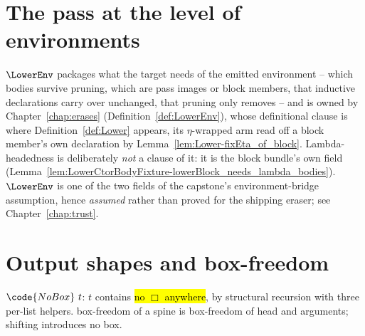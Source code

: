 \section{The pass at the level of environments}
\label{sec:lowering:env}

$\LowerEnv$ packages what the target needs of the emitted environment -- which bodies survive pruning,
which are pass images or block members, that inductive declarations carry over unchanged, that pruning
only removes -- and is owned by Chapter~\ref{chap:erases} (Definition~\ref{def:LowerEnv}), whose
definitional clause is where Definition~\ref{def:Lower} appears, its $\eta$-wrapped arm read off a
block member's own declaration by Lemma~\ref{lem:Lower-fixEta_of_block}. Lambda-headedness is
deliberately \emph{not} a clause of it: it is the block bundle's own 
field (Lemma~\ref{lem:LowerCtorBodyFixture-lowerBlock_needs_lambda_bodies}). $\LowerEnv$ is one of the
two fields of the capstone's environment-bridge assumption, hence \emph{assumed} rather than proved for
the shipping eraser; see Chapter~\ref{chap:trust}.

\section{Output shapes and box-freedom}
\label{sec:lowering:shape}

\begin{definition}
\label{def:NoBox}
\leanok
{}
 $\code{NoBox}\ t$: $t$ contains \hl{no $\Box$ anywhere}, by structural recursion with
three per-list helpers.
 box-freedom of a spine is box-freedom of head and arguments; shifting introduces no box.
\end{definition}

